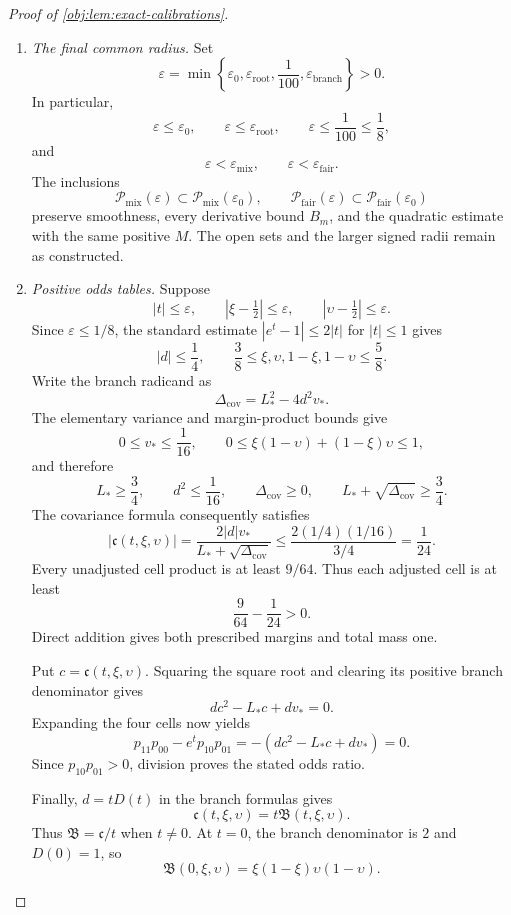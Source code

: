 \documentclass[11pt]{article}
\begin{document}
\begin{proof}[Proof of \cref{obj:lem:exact-calibrations}]
\begin{enumerate}
\item \emph{The final common radius.}
Set
\[
\varepsilon
=
\min\left\{
\varepsilon_0,\varepsilon_{\mathrm{root}},
\frac1{100},\varepsilon_{\mathrm{branch}}
\right\}>0.
\]
In particular,
\[
\varepsilon\le\varepsilon_0,\qquad
\varepsilon\le\varepsilon_{\mathrm{root}},\qquad
\varepsilon\le\frac1{100}\le\frac18,
\]
and
\[
\varepsilon<\varepsilon_{\mathrm{mix}},
\qquad
\varepsilon<\varepsilon_{\mathrm{fair}}.
\]
The inclusions
\[
\mathcal P_{\mathrm{mix}}(\varepsilon)
\subset\mathcal P_{\mathrm{mix}}(\varepsilon_0),
\qquad
\mathcal P_{\mathrm{fair}}(\varepsilon)
\subset\mathcal P_{\mathrm{fair}}(\varepsilon_0)
\]
preserve smoothness, every derivative bound \(B_m\), and the quadratic estimate with the same positive \(M\). The open sets and the larger signed radii remain as constructed.

\item \emph{Positive odds tables.}
Suppose
\[
|t|\le\varepsilon,\qquad
|\xi-\tfrac12|\le\varepsilon,\qquad
|\upsilon-\tfrac12|\le\varepsilon.
\]
Since \(\varepsilon\le1/8\), the standard estimate
\(|e^t-1|\le2|t|\) for \(|t|\le1\) gives
\[
|d|\le\frac14,\qquad
\frac38\le\xi,\upsilon,1-\xi,1-\upsilon\le\frac58.
\]
Write the branch radicand as
\[
\Delta_{\mathrm{cov}}=L_*^2-4d^2v_*.
\]
The elementary variance and margin-product bounds give
\[
0\le v_*\le\frac1{16},
\qquad
0\le\xi(1-\upsilon)+(1-\xi)\upsilon\le1,
\]
and therefore
\[
L_*\ge\frac34,\qquad
d^2\le\frac1{16},\qquad
\Delta_{\mathrm{cov}}\ge0,\qquad
L_*+\sqrt{\Delta_{\mathrm{cov}}}\ge\frac34.
\]
The covariance formula consequently satisfies
\[
|\mathfrak c(t,\xi,\upsilon)|
=
\frac{2|d|v_*}{L_*+\sqrt{\Delta_{\mathrm{cov}}}}
\le
\frac{2(1/4)(1/16)}{3/4}
=\frac1{24}.
\]
Every unadjusted cell product is at least \(9/64\). Thus each adjusted cell is at least
\[
\frac9{64}-\frac1{24}>0.
\]
Direct addition gives both prescribed margins and total mass one.

Put \(c=\mathfrak c(t,\xi,\upsilon)\). Squaring the square root and clearing its positive branch denominator gives
\[
dc^2-L_*c+dv_*=0.
\]
Expanding the four cells now yields
\[
p_{11}p_{00}-e^t p_{10}p_{01}
=-(dc^2-L_*c+dv_*)=0.
\]
Since \(p_{10}p_{01}>0\), division proves the stated odds ratio.

Finally, \(d=tD(t)\) in the branch formulas gives
\[
\mathfrak c(t,\xi,\upsilon)=t\mathfrak B(t,\xi,\upsilon).
\]
Thus \(\mathfrak B=\mathfrak c/t\) when \(t\ne0\). At \(t=0\), the branch denominator is \(2\) and \(D(0)=1\), so
\[
\mathfrak B(0,\xi,\upsilon)
=\xi(1-\xi)\upsilon(1-\upsilon).
\]


\end{enumerate}
\end{proof}
\end{document}

